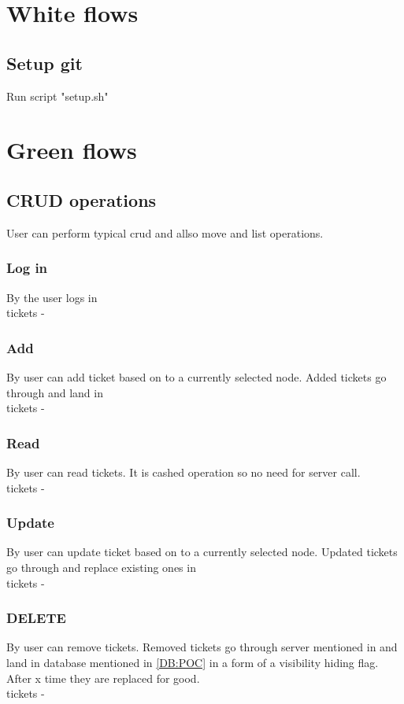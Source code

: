 
\section{White flows}
\subsection{Setup git}
Run script "setup.sh"
\section{Green flows}
\subsection{CRUD operations}\label{GF:CRUD}
User can perform typical crud and allso move and list operations.
\subsubsection{Log in}\label{GF:CRUD:LOGIN}
By the  user logs in \\
tickets - 
\subsubsection{Add}\label{GF:CRUD:ADD}
By  user can add ticket based on  
to a currently selected node. Added tickets go through  and land in \\
tickets - 
\subsubsection{Read}\label{GF:CRUD:READ}
By  user can read tickets. It is cashed operation so no need for server call.\\
tickets - 
\subsubsection{Update}\label{GF:CRUD:UP}
By  user can update ticket based on  
to a currently selected node. Updated tickets go through  and replace existing ones in \\
tickets - 
\subsubsection{DELETE}\label{GF:CRUD:DEL}
By  user can remove tickets. Removed tickets go through server mentioned 
in  and land in database mentioned in \ref{DB:POC} in a form of a visibility 
hiding flag. After x time they are replaced for good.\\
tickets - 
